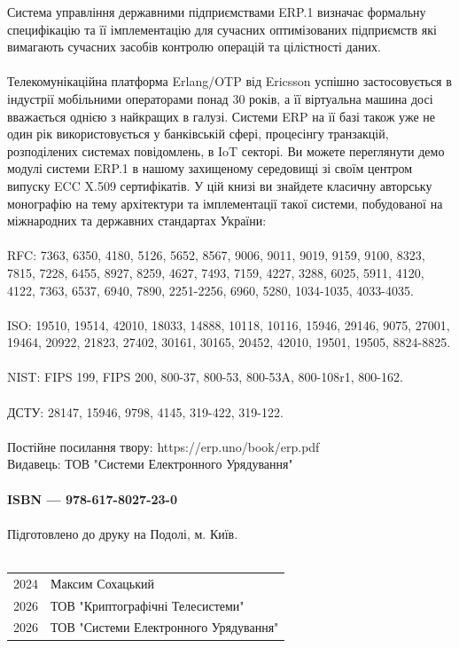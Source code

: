 Система управління державними підприємствами ERP.1 визначає формальну
специфікацію та її імплементацію для сучасних оптимізованих підприємств
які вимагають сучасних засобів контролю операцій та цілістності даних.
\\
\\
Телекомунікаційна платформа Erlang/OTP від Ericsson успішно застосовується
в індустрії мобільними операторами понад 30 років, а її віртуальна машина
досі вважається однією з найкращих в галузі. Системи ERP на її базі також
уже не один рік використовується у банківській сфері, процесінгу транзакцій,
розподілених системах повідомлень, в IoT секторі. Ви можете переглянути демо
модулі системи ERP.1 в нашому захищеному середовищі зі своїм центром
випуску ECC X.509 сертифікатів. У цій книзі ви знайдете класичну авторську
монографію на тему архітектури та імплементації такої системи, побудованої
на міжнародних та державних стандартах України:
\\
\\
RFC: 7363, 6350, 4180, 5126, 5652,
     8567, 9006, 9011, 9019, 9159, 9100, 8323, 7815, 7228, 6455,
     8927, 8259, 4627, 7493, 7159, 4227, 3288, 6025, 5911, 4120, 4122, 7363, 6537, 6940, 7890,
     2251-2256, 6960, 5280, 1034-1035, 4033-4035.
\\
\\
ISO: 19510, 19514, 42010, 18033, 14888, 10118, 10116, 15946, 29146,
     9075, 27001,
     19464, 20922, 21823, 27402, 30161, 30165,
     20452, 42010, 19501, 19505,
     8824-8825.
\\
\\
NIST: FIPS 199, FIPS 200, 800-37, 800-53, 800-53A, 800-108r1, 800-162.
\\
\\
ДСТУ: 28147, 15946, 9798, 4145, 319-422, 319-122.
\\
\\
Постійне посилання твору: https://erp.uno/book/erp.pdf \\
Видавець: ТОВ "Системи Електронного Урядування"
\\
\\
{\bf ISBN --- 978-617-8027-23-0 \hspace{2em}}
\\
\\
Підготовлено до друку на Подолі, м. Київ.
\\
\\
\begin{tabular}{ll}
\textcopyright{} 2024 & Максим Сохацький \\
\textcopyright{} 2026 & ТОВ "Криптографічні Телесистеми" \\
\textcopyright{} 2026 & ТОВ "Системи Електронного Урядування"
\end{tabular}

\newpage
\cleartorecto
\tableofcontents*
\mainmatter
